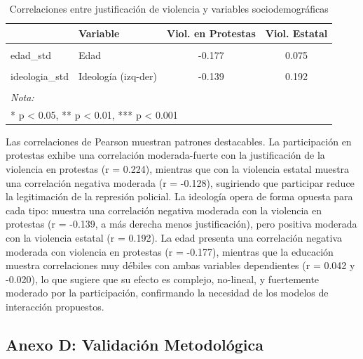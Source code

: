 \documentclass[
  13pt,
]{article}
\begin{document}
\begin{longtable}[t]{llcc}

\caption{\label{tbl-correlaciones}Correlaciones entre justificación de
violencia y variables sociodemográficas}

\tabularnewline

\toprule
 & Variable & Viol. en Protestas & Viol. Estatal\\
\midrule
\cellcolor{gray!10}{educ\_num} & \cellcolor{gray!10}{Educación} & \cellcolor{gray!10}{0.042} & \cellcolor{gray!10}{-0.020}\\
edad\_std & Edad & -0.177 & 0.075\\
\cellcolor{gray!10}{mujer\_num} & \cellcolor{gray!10}{Mujer} & \cellcolor{gray!10}{-0.026} & \cellcolor{gray!10}{-0.061}\\
ideologia\_std & Ideología (izq-der) & -0.139 & 0.192\\
\cellcolor{gray!10}{protesta\_dummy} & \cellcolor{gray!10}{Participación en protesta} & \cellcolor{gray!10}{0.224} & \cellcolor{gray!10}{-0.128}\\
\bottomrule
\multicolumn{4}{l}{\rule{0pt}{1em}\textit{Nota:}}\\
\multicolumn{4}{l}{\rule{0pt}{1em}* p < 0.05, ** p < 0.01, *** p < 0.001}\\

\end{longtable}

\endgroup{}

Las correlaciones de Pearson muestran patrones destacables. La
participación en protestas exhibe una correlación moderada-fuerte con la
justificación de la violencia en protestas (r = 0.224), mientras que con
la violencia estatal muestra una correlación negativa moderada (r =
-0.128), sugiriendo que participar reduce la legitimación de la
represión policial. La ideología opera de forma opuesta para cada tipo:
muestra una correlación negativa moderada con la violencia en protestas
(r = -0.139, a más derecha menos justificación), pero positiva moderada
con la violencia estatal (r = 0.192). La edad presenta una correlación
negativa moderada con violencia en protestas (r = -0.177), mientras que
la educación muestra correlaciones muy débiles con ambas variables
dependientes (r = 0.042 y -0.020), lo que sugiere que su efecto es
complejo, no-lineal, y fuertemente moderado por la participación,
confirmando la necesidad de los modelos de interacción propuestos.

\subsection{Anexo D: Validación
Metodológica}\label{anexo-d-validaciuxf3n-metodoluxf3gica}
\end{document}
